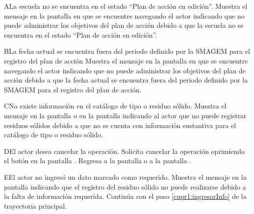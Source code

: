 \begin{UCtrayectoriaA}{A}{La escuela no se encuentra en el estado ``Plan de acción en edición''.}
    \UCpaso[\UCsist] Muestra el mensaje  en la pantalla en que se encuentre navegando el actor indicando que no puede administrar los objetivos del plan de acción debido a que la escuela no se encuentra en el estado ``Plan de acción en edición''. 
 \end{UCtrayectoriaA}
 
   \begin{UCtrayectoriaA}{B}{La fecha actual se encuentra fuera del periodo definido por la SMAGEM para el registro del plan de acción}
    \UCpaso[\UCsist] Muestra el mensaje  en la pantalla en que se encuentre navegando el actor indicando que no puede administrar los objetivos del plan de acción debido a que la fecha actual se encuentra fuera del periodo definido por la SMAGEM para el registro del plan de acción.
 \end{UCtrayectoriaA}

 \begin{UCtrayectoriaA}{C}{No existe información en el catálogo de tipo o residuo sólido.}
    \UCpaso[\UCsist] Muestra el mensaje  en la pantalla  o en la pantalla  indicando al actor que no puede registrar residuos sólidos debido a que no se cuenta con información sustantiva para el catálogo de tipo o residuo sólido.
 \end{UCtrayectoriaA}
 
    \begin{UCtrayectoriaA}{D}{El actor desea cancelar la operación.}
    \UCpaso[\UCactor] Solicita cancelar la operación oprimiendo el botón  en la pantalla .
    \UCpaso[\UCsist] Regresa a la pantalla  o a la pantalla . 
    \end{UCtrayectoriaA}
 
    \begin{UCtrayectoriaA}{E}{El actor no ingresó un dato marcado como requerido.}    
    \UCpaso[\UCsist] Muestra el mensaje  en la pantalla  indicando que el registro del residuo sólido no puede realizarse debido a la falta de información requerida.
    \UCpaso[] Continúa con el paso \ref{cupr1:ingresarInfo} de la trayectoria principal.     
    \end{UCtrayectoriaA}
 
